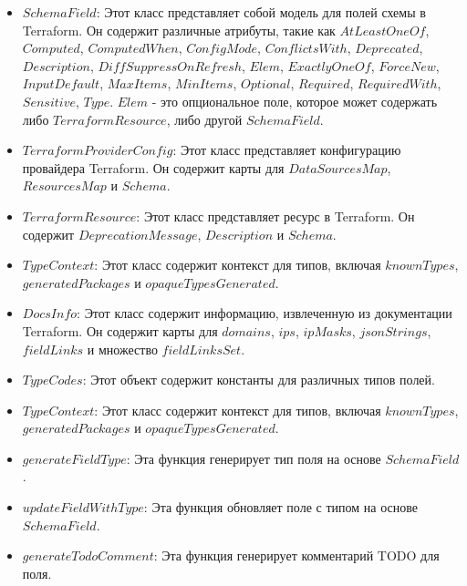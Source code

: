   \begin{itemize}
    \item $SchemaField$: Этот класс представляет собой модель для полей схемы в
  Terraform. Он содержит различные атрибуты, такие как $AtLeastOneOf$,
$Computed$,
  $ComputedWhen$, $ConfigMode$, $ConflictsWith$, $Deprecated$, $Description$,
  $DiffSuppressOnRefresh$, $Elem$, $ExactlyOneOf$, $ForceNew$, $InputDefault$,
  $MaxItems$, $MinItems$, $Optional$, $Required$, $RequiredWith$, $Sensitive$,
  $Type$. $Elem$ - это опциональное поле, которое может содержать либо
  $TerraformResource$, либо другой $SchemaField$.

    \item $TerraformProviderConfig$: Этот класс представляет конфигурацию
  провайдера Terraform. Он содержит карты для $DataSourcesMap$, $ResourcesMap$ и
  $Schema$.

    \item $TerraformResource$: Этот класс представляет ресурс в Terraform. Он
  содержит \newline $DeprecationMessage$, $Description$ и $Schema$.

    \item $TypeContext$: Этот класс содержит контекст для типов, включая
  $knownTypes$, $generatedPackages$ и $opaqueTypesGenerated$.

    \item $DocsInfo$: Этот класс содержит информацию, извлеченную из
документации
  Terraform. Он содержит карты для $domains$, $ips$, $ipMasks$, $jsonStrings$,
  $fieldLinks$ и множество $fieldLinksSet$.

    \item $TypeCodes$: Этот объект содержит константы для различных типов полей.

    \item $TypeContext$: Этот класс содержит контекст для типов, включая
  $knownTypes$, \newline $generatedPackages$ и $opaqueTypesGenerated$.

    \item $generateFieldType$: Эта функция генерирует тип поля на основе
  $SchemaField$.

    \item $updateFieldWithType$: Эта функция обновляет поле с типом на основе
  $SchemaField$.

    \item $generateTodoComment$: Эта функция генерирует комментарий TODO для
поля.


\end{itemize}
